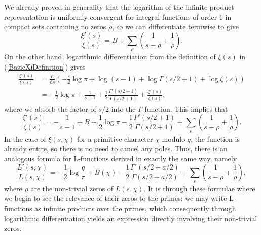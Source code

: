 We already proved in generality that the logarithm of the infinite product representation is uniformly convergent for integral functions of order 1 in compact sets containing no zeros $\rho$, so we can differentiate termwise to give 
\begin{equation}
    \frac{\xi'(s)}{\xi(s)} = B + \sum_{\rho} \left( \frac{1}{s-\rho} + \frac{1}{\rho} \right). \nonumber
\end{equation}
On the other hand, logarithmic differentiation from the definition of $\xi(s)$ in (\ref{BasicXiDefinition}) gives
\begin{align}
    \frac{\xi'(s)}{\xi(s)} &= \frac{\mathrm{d}}{\mathrm{d}s} \left( - \frac{s}{2}\log \pi + \log (s-1) + \log \Gamma(s/2 + 1) + \log \zeta(s) \right) \nonumber \\
    &= -\frac12 \log \pi + \frac{1}{s-1} + \frac12 \frac{\Gamma'(s/2 + 1)}{\Gamma(s/2 + 1)} + \frac{\zeta'(s)}{\zeta(s)}, \nonumber
\end{align}
where we absorb the factor of $s/2$ into the $\Gamma$-function. This implies that
\begin{equation}
\label{ZetaPartialFraction}
    \frac{\zeta'(s)}{\zeta(s)} = -\frac{1}{s-1} + B + \frac12 \log \pi - \frac12 \frac{\Gamma'(s/2 + 1)}{\Gamma(s/2 + 1)} + \sum_{\rho} \left( \frac{1}{s-\rho} + \frac{1}{\rho} \right).
\end{equation}
In the case of $\xi(s, \chi)$ for a primitive character $\chi$ modulo $q$, the function is already entire, so there is no need to cancel any poles. Thus, there is an analogous formula for L-functions derived in exactly the same way, namely
\begin{equation}
\label{LPartialFraction}
    \frac{L'(s, \chi)}{L(s, \chi)} = -\frac12 \log \frac{q}{\pi} + B(\chi) - \frac12 \frac{\Gamma'(s/2 + a/2)}{\Gamma(s/2 + a/2)} + \sum_{\rho} \left( \frac{1}{s-\rho} + \frac{1}{\rho} \right), 
\end{equation}
where $\rho$ are the non-trivial zeros of $L(s, \chi)$. It is through these formulae where we begin to see the relevance of their zeros to the primes: we may write L-functions as infinite products over the primes, which consequently through logarithmic differentiation yields an expression directly involving their non-trivial zeros.